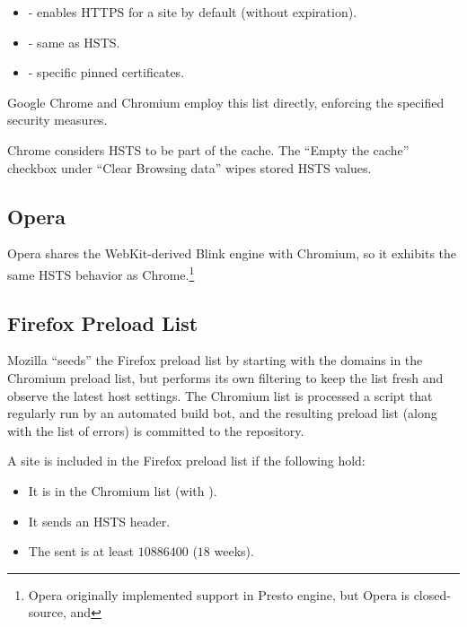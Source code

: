 \documentclass{acm_proc_article-sp}
\begin{document}
\begin{itemize}
\item {} - enables HTTPS for a site by default (without expiration).
\item {\iSD} - same as HSTS.
\item {} - specific pinned certificates.
\end{itemize}

Google Chrome and Chromium employ this list directly, enforcing the specified security measures.

Chrome considers HSTS to be part of the cache. The ``Empty the cache'' checkbox under ``Clear Browsing data'' wipes stored HSTS values.

\subsection{Opera}

Opera shares the WebKit-derived Blink engine with Chromium, so it exhibits the same HSTS behavior as Chrome.\footnote{Opera originally implemented support in Presto engine\cite{opera}, but Opera is closed-source, and }

\subsection{Firefox Preload List}

Mozilla ``seeds'' the Firefox preload list by starting with the domains in the Chromium preload list, but performs its own filtering to keep the list fresh and observe the latest host settings. The Chromium list is processed a script\cite{firefox-script} that regularly run \cite{firefox-cron-script} by an automated build bot\cite{firefox-cron}, and the resulting preload list\cite{firefox-list} (along with the list of errors\cite{firefox-errors}) is committed to the  repository.

A site is included in the Firefox preload list if the following hold:

\begin{itemize}
\item It is in the Chromium list (with ).
\item It sends an HSTS header.
\item The  sent is at least $10886400$ ($18$ weeks).
\end{itemize}
\end{document}
